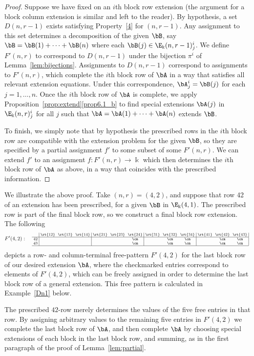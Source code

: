 \begin{proof}
Suppose we have fixed on an $i$th block row extension (the argument
for a block column extension is similar and left to the reader). By
hypothesis, a set $D(n,r-1)$ exists satisfying Property~\ref{4} for
$(n,r-1)$. Any assignment to this set determines a decomposition of
the given $\bB$, say $\bB = \bB(1)+ \cdots + \bB(n)$ where each
$\bB(j) \in \E_\Bbbk(n,r-1)^i_j$. We define $F'(n,r)$ to correspond
to $D(n,r-1)$ under the bijection $\pi^i$ of Lemma~\ref{lem:bijections}. Assignments to $D(n,r-1)$ correspond to
assignments to $F'(n,r)$, which complete the $i$th block row of $\bA$
in a way that satisfies all relevant extension equations. Under this
correspondence, $\bA^i_j = \bB(j)$ for each $j=1,\dots,n$. Once the
$i$th block row of $\bA$ is complete, we apply Proposition~\ref{prop:extend}\ref{prop6.1_b} to find special extensions $\bA(j)$ in $\E_\Bbbk(n,r)^i_j$ for all $j$ such that $\bA=\bA(1)+ \cdots +
\bA(n)$ extends $\bB$.

To finish, we simply note that by hypothesis the prescribed rows in
the $i$th block row are compatible with the extension problem for the
given $\bB$, so they are specified by a partial assignment $f'$ to
some subset of some $F'(n,r)$. We can extend $f'$ to an assignment
$f:F'(n,r)\to \Bbbk$ which then determines the $i$th block row of
$\bA$ as above, in a way that coincides with the prescribed
information.
\end{proof}



\goodbreak
\begin{exam}
We illustrate the above proof. Take $(n,r)=(4,2)$, and suppose that
row 42 of an extension has been prescribed, for a given $\bB$ in
$\E_\Bbbk(4,1)$. The prescribed row is part of the final block row, so
we construct a final block row extension. The following
\[
F'(4,2): \quad
\text{\setlength{\arraycolsep}{2.7pt}\scriptsize
$\displaystyle \begin{array}{c|ccc|ccc|ccc|ccc|}
 &\rt{12}&\rt{13}&\rt{14}&\rt{21} &\rt{23}&\rt{24}&\rt{31}&\rt{32}
 &\rt{34}&\rt{41}&\rt{42}&\rt{43} \\ \hline 
 42 &&&		&&&\cm		&&\cm&\cm	&&\cm&\cm\\ 
 43 &&&		&&&\cm		&&\cm&\cm	&&\cm&\cm\\ 
 \hline
\end{array}\; $}
\]
depicts a row- and column-terminal free-pattern $F'(4,2)$ for the last
block row of our desired extension $\bA$, where the checkmarked entries
correspond to elements of $F'(4,2)$, which can be freely assigned in
order to determine the last block row of a general extension. This
free pattern is calculated in Example~\ref{Dn1} below.

The prescribed $42$-row merely determines the values of the five free
entries in that row. By assigning arbitrary values to the remaining
five entries in $F'(4,2)$ we complete the last block row of $\bA$, and
then complete $\bA$ by choosing special extensions of each block in
the last block row, and summing, as in the first paragraph of the
proof of Lemma~\ref{lem:partial}.
\end{exam}


